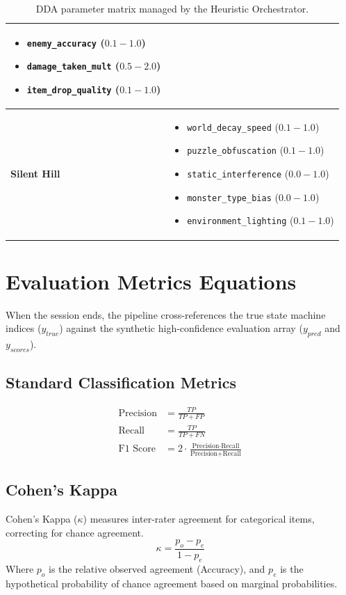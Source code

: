 \documentclass[11pt,a4paper]{article}
\begin{document}
\begin{table}[h!]
{\begin{tabular}{@{} l >{\raggedright\arraybackslash}p{10cm} @{}}
\begin{itemize}
            \item \texttt{enemy\_accuracy} ($0.1 - 1.0$)
            \item \texttt{damage\_taken\_mult} ($0.5 - 2.0$)
            \item \texttt{item\_drop\_quality} ($0.1 - 1.0$)
        \end{itemize} \\
        \midrule
        \textbf{Silent Hill} & 
        \begin{itemize}
            \item \texttt{world\_decay\_speed} ($0.1 - 1.0$)
            \item \texttt{puzzle\_obfuscation} ($0.1 - 1.0$)
            \item \texttt{static\_interference} ($0.0 - 1.0$)
            \item \texttt{monster\_type\_bias} ($0.0 - 1.0$)
            \item \texttt{environment\_lighting} ($0.1 - 1.0$)
        \end{itemize} \\
        \bottomrule
    \end{tabular}%
    }
    \caption{DDA parameter matrix managed by the Heuristic Orchestrator.}
    \label{tab:dda_params}
\end{table}

\section{Evaluation Metrics Equations}

When the session ends, the pipeline cross-references the true state machine indices ($y_{true}$) against the synthetic high-confidence evaluation array ($y_{pred}$ and $y_{scores}$).

\subsection{Standard Classification Metrics}
\begin{align}
    \text{Precision} &= \frac{TP}{TP + FP} \\
    \text{Recall} &= \frac{TP}{TP + FN} \\
    \text{F1 Score} &= 2 \cdot \frac{\text{Precision} \cdot \text{Recall}}{\text{Precision} + \text{Recall}}
\end{align}

\subsection{Cohen's Kappa}
Cohen's Kappa ($\kappa$) measures inter-rater agreement for categorical items, correcting for chance agreement.
\begin{equation}
    \kappa = \frac{p_o - p_e}{1 - p_e}
\end{equation}
Where $p_o$ is the relative observed agreement (Accuracy), and $p_e$ is the hypothetical probability of chance agreement based on marginal probabilities.
\end{document}

